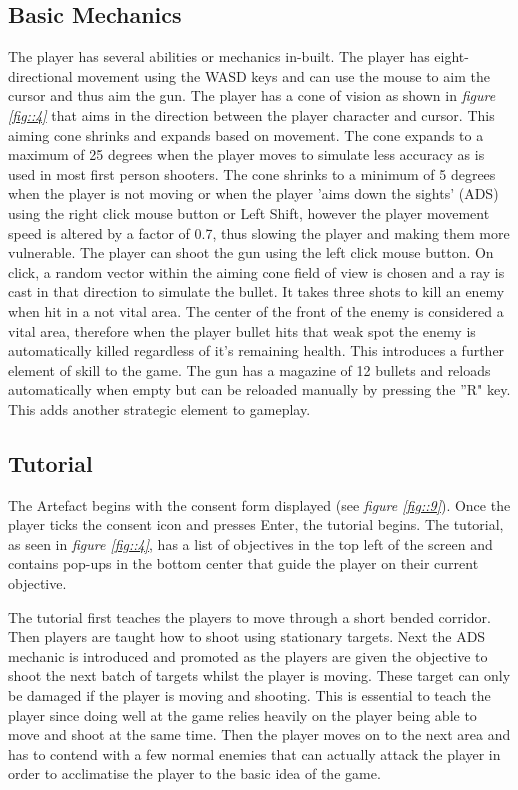 \documentclass[journal]{IEEEtran}
\begin{document}
\subsection{Basic Mechanics}
The player has several abilities or mechanics in-built. The player has eight-directional movement using the WASD keys and can use the mouse to aim the cursor and thus aim the gun. 
The player has a cone of vision as shown in \textit{figure \ref{fig::4}} that aims in the direction between the player character and cursor. This aiming cone shrinks and expands based on movement. The cone expands to a maximum of 25 degrees when the player moves to simulate less accuracy as is used in most first person shooters. The cone shrinks to a minimum of 5 degrees when the player is not moving or when the player 'aims down the sights' (ADS) using the right click mouse button or Left Shift, however the player movement speed is altered by a factor of 0.7, thus slowing the player and making them more vulnerable. 
The player can shoot the gun using the left click mouse button. On click, a random vector within the aiming cone field of view is chosen and a ray is cast in that direction to simulate the bullet. It takes three shots to kill an enemy when hit in a not vital area. The center of the front of the enemy is considered a vital area, therefore when the player bullet hits that weak spot the enemy is automatically killed regardless of it's remaining health. This introduces a further element of skill to the game.
The gun has a magazine of 12 bullets and reloads automatically when empty but can be reloaded manually by pressing the ''R" key. This adds another strategic element to gameplay.

\subsection{Tutorial}
The Artefact begins with the consent form displayed (see \textit{figure \ref{fig::9}}). Once the player ticks the consent icon and presses Enter, the tutorial begins. The tutorial, as seen in \textit{figure \ref{fig::4}}, has a list of objectives in the top left of the screen and contains pop-ups in the bottom center that guide the player on their current objective. 

The tutorial first teaches the players to move through a short bended corridor. Then players are taught how to shoot using stationary targets. Next the ADS mechanic is introduced and promoted as the players are given the objective to shoot the next batch of targets whilst the player is moving. These target can only be damaged if the player is moving and shooting. This is essential to teach the player since doing well at the game relies heavily on the player being able to move and shoot at the same time. Then the player moves on to the next area and has to contend with a few normal enemies that can actually attack the player in order to acclimatise the player to the basic idea of the game.
\end{document}
